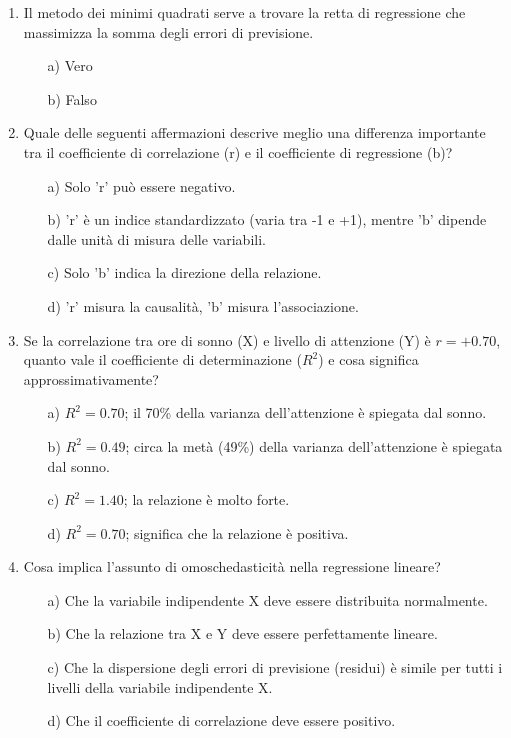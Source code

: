 \documentclass[12pt, a4paper]{article}
\newcommand{\rsq}{R^2}
\begin{document}
\begin{enumerate}
\item  Il metodo dei minimi quadrati serve a trovare la retta di regressione che massimizza la somma degli errori di previsione.
 \begin{itemize}
    \item[a)] Vero
    \item[b)] Falso
\end{itemize}
\vspace{0.3cm}


      
\item  Quale delle seguenti affermazioni descrive meglio una differenza importante tra il coefficiente di correlazione (r) e il coefficiente di regressione (b)?
    \begin{itemize}
        \item[a)] Solo 'r' può essere negativo.
        \item[b)] 'r' è un indice standardizzato (varia tra -1 e +1), mentre 'b' dipende dalle unità di misura delle variabili.
        \item[c)] Solo 'b' indica la direzione della relazione.
        \item[d)] 'r' misura la causalità, 'b' misura l'associazione.
    \end{itemize}
    \vspace{0.3cm}

\item  Se la correlazione tra ore di sonno (X) e livello di attenzione (Y) è $r = +0.70$, quanto vale il coefficiente di determinazione ($\rsq$) e cosa significa approssimativamente?
\begin{itemize}
    \item[a)] $\rsq = 0.70$; il 70\% della varianza dell'attenzione è spiegata dal sonno.
    \item[b)] $\rsq = 0.49$; circa la metà (49\%) della varianza dell'attenzione è spiegata dal sonno.
    \item[c)] $\rsq = 1.40$; la relazione è molto forte.
    \item[d)] $\rsq = 0.70$; significa che la relazione è positiva.
\end{itemize}
\vspace{0.3cm}

\item  Cosa implica l'assunto di omoschedasticità nella regressione lineare?
\begin{itemize}
    \item[a)] Che la variabile indipendente X deve essere distribuita normalmente.
    \item[b)] Che la relazione tra X e Y deve essere perfettamente lineare.
    \item[c)] Che la dispersione degli errori di previsione (residui) è simile per tutti i livelli della variabile indipendente X.
    \item[d)] Che il coefficiente di correlazione deve essere positivo.
\end{itemize}
\vspace{0.3cm}


\end{enumerate}
\end{document}
